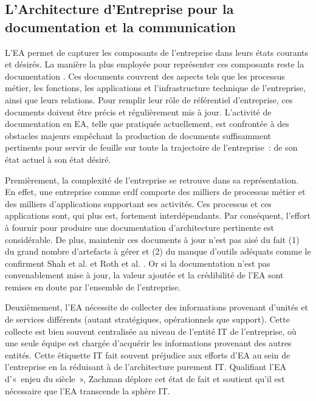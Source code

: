  \subsection{L'Architecture d'Entreprise pour la documentation et la communication}


L'EA permet de capturer les composants de l'entreprise dans
leurs états courants et désirés. La manière la plus employée pour représenter
ces composants reste la documentation \cite{barn2013enterprise}. Ces documents
couvrent des aspects tels que les processus métier, les fonctions, les
applications et l'infrastructure technique de l'entreprise, ainsi que leurs
relations. Pour remplir leur rôle de référentiel d'entreprise, ces documents
doivent être précis et régulièrement mis à jour. L'activité de documentation en
EA, telle que pratiquée actuellement, est confrontée à des obstacles majeurs
empêchant la production de documents suffisamment pertinents pour servir de
feuille sur toute la trajectoire de l'entreprise~: de son état actuel à son
état désiré.

Premièrement, la complexité de l'entreprise se retrouve dans sa
représentation. En effet, une entreprise comme \gls{erdf} comporte des milliers
de processus métier et des milliers d'applications supportant ses activités.
Ces processus et ces applications sont, qui plus est, fortement
interdépendants. Par conséquent, l'effort à fournir pour produire une
documentation d'architecture pertinente est considérable. De plus, maintenir
ces documents à jour n'est pas aisé du fait (1) du grand nombre d'artefacts à
gérer et (2) du manque d'outils adéquats comme le confirment Shah et al.
\cite{shah2007frameworks} et Roth et al. \cite{roth2013enterprise}. Or si la
documentation n'est pas convenablement mise à jour, la valeur ajoutée et la
crédibilité de l'EA sont remises en doute par l'ensemble de l'entreprise.

Deuxièmement, l'EA nécessite de collecter des informations provenant
d'unités et de services différents (autant stratégiques, opérationnels que
support). Cette collecte est bien souvent centralisée au niveau de l'entité IT
de l'entreprise, où une seule équipe est chargée d'acquérir les informations
provenant des autres entités. Cette étiquette IT fait souvent préjudice aux
efforts d'EA au sein de l'entreprise en la réduisant à de l'architecture
purement IT. Qualifiant l'EA d'«~enjeu du siècle~», Zachman déplore cet état de
fait et soutient qu'il est nécessaire que l'EA transcende la sphère IT.


